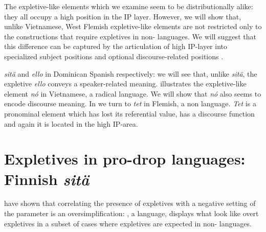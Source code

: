 \documentclass[output=paper]{LSP/langsci}
\begin{document}

The expletive-like elements which we examine seem to be distributionally alike: they all occupy a high position in the IP layer. However, we will show that, unlike Vietnamese, West Flemish expletive-like elements are not restricted only to the constructions that require expletives in non- languages. We will suggest that this difference can be captured by the articulation of high IP-layer into specialized subject positions \citep{Kiss1996,Rizzi2007,Cardinaletti2004} and optional discourse-related positions \citep{Uriagereka2004,Grohmann2000}.

 \textit{sitä}  and \textit{ello} in Dominican Spanish respectively: we will see that, unlike  \textit{sitä}, the expletive \textit{ello} conveys a speaker-related meaning.  illustrates the expletive-like element \textit{nó} in Vietnamese, a radical  language. We will show that \textit{nó} also seems to encode discourse meaning. In  we turn to \textit{tet} in Flemish, a non  language. \textit{Tet} is a pronominal element which has lost its referential value, has a discourse function and again it is located in the high IP-area.

\section{Expletives in pro-drop languages: Finnish \textit{sitä}}\label{sec:Greco:2}
\largerpage

\citet{HolmbergEtAl2002} have shown that correlating the presence of expletives with a negative setting of the  parameter is an oversimplification: , a  language, displays what look like overt expletives in a subset of cases where expletives are expected in non- languages.
\end{document}
